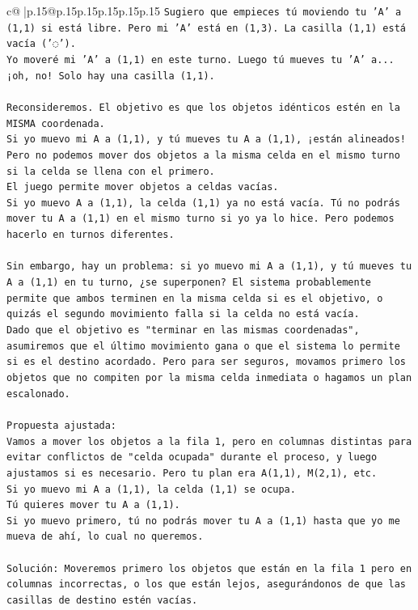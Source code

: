 \documentclass{article}
\begin{document}
{\begin{supertabular}{c@{$\;$}|p{.15\linewidth}@{}p{.15\linewidth}p{.15\linewidth}p{.15\linewidth}p{.15\linewidth}p{.15\linewidth}}
{{{\texttt{Sugiero que empieces tú moviendo tu 'A' a (1,1) si está libre. Pero mi 'A' está en (1,3). La casilla (1,1) está vacía ('◌').} \\
\texttt{Yo moveré mi 'A' a (1,1) en este turno. Luego tú mueves tu 'A' a... ¡oh, no! Solo hay una casilla (1,1).} \\
\\ 
\texttt{Reconsideremos. El objetivo es que los objetos idénticos estén en la MISMA coordenada.} \\
\texttt{Si yo muevo mi A a (1,1), y tú mueves tu A a (1,1), ¡están alineados! Pero no podemos mover dos objetos a la misma celda en el mismo turno si la celda se llena con el primero.} \\
\texttt{El juego permite mover objetos a celdas vacías.} \\
\texttt{Si yo muevo A a (1,1), la celda (1,1) ya no está vacía. Tú no podrás mover tu A a (1,1) en el mismo turno si yo ya lo hice. Pero podemos hacerlo en turnos diferentes.} \\
\\ 
\texttt{Sin embargo, hay un problema: si yo muevo mi A a (1,1), y tú mueves tu A a (1,1) en tu turno, ¿se superponen? El sistema probablemente permite que ambos terminen en la misma celda si es el objetivo, o quizás el segundo movimiento falla si la celda no está vacía.} \\
\texttt{Dado que el objetivo es "terminar en las mismas coordenadas", asumiremos que el último movimiento gana o que el sistema lo permite si es el destino acordado. Pero para ser seguros, movamos primero los objetos que no compiten por la misma celda inmediata o hagamos un plan escalonado.} \\
\\ 
\texttt{Propuesta ajustada:} \\
\texttt{Vamos a mover los objetos a la fila 1, pero en columnas distintas para evitar conflictos de "celda ocupada" durante el proceso, y luego ajustamos si es necesario. Pero tu plan era A(1,1), M(2,1), etc.} \\
\texttt{Si yo muevo mi A a (1,1), la celda (1,1) se ocupa.} \\
\texttt{Tú quieres mover tu A a (1,1).} \\
\texttt{Si yo muevo primero, tú no podrás mover tu A a (1,1) hasta que yo me mueva de ahí, lo cual no queremos.} \\
\\ 
\texttt{Solución: Moveremos primero los objetos que están en la fila 1 pero en columnas incorrectas, o los que están lejos, asegurándonos de que las casillas de destino estén vacías.} \\
}}}
\end{supertabular}}
\end{document}
